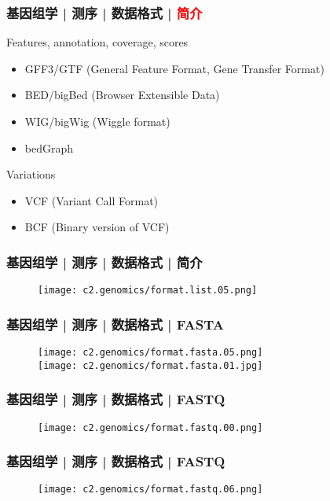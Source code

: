 \begin{frame}
  \frametitle{基因组学 | 测序 | 数据格式 | \textcolor{red}{简介}}
  \begin{block}{Features, annotation, coverage, scores}
    \begin{itemize}
      \item GFF3/GTF (General Feature Format, Gene Transfer Format)
      \item BED/bigBed (Browser Extensible Data)
      \item WIG/bigWig (Wiggle format)
      \item bedGraph
    \end{itemize}
  \end{block}
  \pause
  \begin{block}{Variations}
    \begin{itemize}
      \item VCF (Variant Call Format)
      \item BCF (Binary version of VCF)
    \end{itemize}
  \end{block}
\end{frame}

\begin{frame}
  \frametitle{基因组学 | 测序 | 数据格式 | 简介}
  \begin{figure}
    \centering
    \texttt{[image: c2.genomics/format.list.05.png]}
  \end{figure}
\end{frame}
    
\begin{frame}
  \frametitle{基因组学 | 测序 | 数据格式 | FASTA}
  \begin{figure}
    \centering
    \texttt{[image: c2.genomics/format.fasta.05.png]}\\
    \vspace{1em}
    \texttt{[image: c2.genomics/format.fasta.01.jpg]}
  \end{figure}
\end{frame}
    
\begin{frame}
  \frametitle{基因组学 | 测序 | 数据格式 | FASTQ}
  \begin{figure}
    \centering
    \texttt{[image: c2.genomics/format.fastq.00.png]}
  \end{figure}
\end{frame}

\begin{frame}
  \frametitle{基因组学 | 测序 | 数据格式 | FASTQ}
  \begin{figure}
    \centering
    \texttt{[image: c2.genomics/format.fastq.06.png]}
  \end{figure}
\end{frame}

